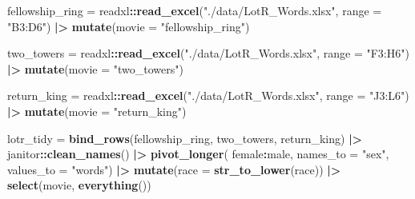 \documentclass[
]{article}
\newenvironment{Shaded}{\begin{snugshade}}{\end{snugshade}}
\newcommand{\AttributeTok}[1]{\textcolor[rgb]{0.13,0.29,0.53}{#1}}
\newcommand{\FunctionTok}[1]{\textcolor[rgb]{0.13,0.29,0.53}{\textbf{#1}}}
\newcommand{\NormalTok}[1]{#1}
\newcommand{\OtherTok}[1]{\textcolor[rgb]{0.56,0.35,0.01}{#1}}
\newcommand{\SpecialCharTok}[1]{\textcolor[rgb]{0.81,0.36,0.00}{\textbf{#1}}}
\newcommand{\StringTok}[1]{\textcolor[rgb]{0.31,0.60,0.02}{#1}}
\begin{document}
\begin{Shaded}
\begin{Highlighting}[]
\NormalTok{fellowship\_ring }\OtherTok{=}\NormalTok{ readxl}\SpecialCharTok{::}\FunctionTok{read\_excel}\NormalTok{(}\StringTok{"./data/LotR\_Words.xlsx"}\NormalTok{, }\AttributeTok{range =} \StringTok{"B3:D6"}\NormalTok{) }\SpecialCharTok{|\textgreater{}}
  \FunctionTok{mutate}\NormalTok{(}\AttributeTok{movie =} \StringTok{"fellowship\_ring"}\NormalTok{)}

\NormalTok{two\_towers }\OtherTok{=}\NormalTok{ readxl}\SpecialCharTok{::}\FunctionTok{read\_excel}\NormalTok{(}\StringTok{"./data/LotR\_Words.xlsx"}\NormalTok{, }\AttributeTok{range =} \StringTok{"F3:H6"}\NormalTok{) }\SpecialCharTok{|\textgreater{}}
  \FunctionTok{mutate}\NormalTok{(}\AttributeTok{movie =} \StringTok{"two\_towers"}\NormalTok{)}

\NormalTok{return\_king }\OtherTok{=}\NormalTok{ readxl}\SpecialCharTok{::}\FunctionTok{read\_excel}\NormalTok{(}\StringTok{"./data/LotR\_Words.xlsx"}\NormalTok{, }\AttributeTok{range =} \StringTok{"J3:L6"}\NormalTok{) }\SpecialCharTok{|\textgreater{}}
  \FunctionTok{mutate}\NormalTok{(}\AttributeTok{movie =} \StringTok{"return\_king"}\NormalTok{)}

\NormalTok{lotr\_tidy }\OtherTok{=} \FunctionTok{bind\_rows}\NormalTok{(fellowship\_ring, two\_towers, return\_king) }\SpecialCharTok{|\textgreater{}}
\NormalTok{  janitor}\SpecialCharTok{::}\FunctionTok{clean\_names}\NormalTok{() }\SpecialCharTok{|\textgreater{}}
  \FunctionTok{pivot\_longer}\NormalTok{(}
\NormalTok{    female}\SpecialCharTok{:}\NormalTok{male,}
    \AttributeTok{names\_to =} \StringTok{"sex"}\NormalTok{,}
    \AttributeTok{values\_to =} \StringTok{"words"}\NormalTok{) }\SpecialCharTok{|\textgreater{}} 
  \FunctionTok{mutate}\NormalTok{(}\AttributeTok{race =} \FunctionTok{str\_to\_lower}\NormalTok{(race)) }\SpecialCharTok{|\textgreater{}} 
  \FunctionTok{select}\NormalTok{(movie, }\FunctionTok{everything}\NormalTok{()) }
\end{Highlighting}
\end{Shaded}
\end{document}
